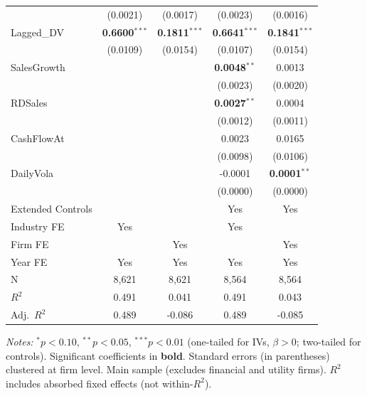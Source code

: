 \documentclass[11pt,a4paper]{article}
\begin{document}
\begin{table}[htbp]
\begin{tabular}{lcccc}
 & (0.0021) & (0.0017) & (0.0023) & (0.0016) \\
Lagged\_DV & \textbf{0.6600}$^{***}$ & \textbf{0.1811}$^{***}$ & \textbf{0.6641}$^{***}$ & \textbf{0.1841}$^{***}$ \\
 & (0.0109) & (0.0154) & (0.0107) & (0.0154) \\
SalesGrowth &  &  & \textbf{0.0048}$^{**}$ & 0.0013 \\
 &  &  & (0.0023) & (0.0020) \\
RDSales &  &  & \textbf{0.0027}$^{**}$ & 0.0004 \\
 &  &  & (0.0012) & (0.0011) \\
CashFlowAt &  &  & 0.0023 & 0.0165 \\
 &  &  & (0.0098) & (0.0106) \\
DailyVola &  &  & -0.0001 & \textbf{0.0001}$^{**}$ \\
 &  &  & (0.0000) & (0.0000) \\
\midrule
Extended Controls &  &  & Yes & Yes \\
Industry FE & Yes &  & Yes &  \\
Firm FE &  & Yes &  & Yes \\
Year FE & Yes & Yes & Yes & Yes \\
\midrule
N & 8,621 & 8,621 & 8,564 & 8,564 \\
$R^2$ & 0.491 & 0.041 & 0.491 & 0.043 \\
Adj.~$R^2$ & 0.489 & -0.086 & 0.489 & -0.085 \\
\bottomrule
\end{tabular}
\begin{minipage}{\linewidth}
\vspace{2pt}\scriptsize
\textit{Notes:} $^{*}p<0.10$, $^{**}p<0.05$, $^{***}p<0.01$ (one-tailed for IVs, $\beta > 0$; two-tailed for controls).
 Significant coefficients in \textbf{bold}.
 Standard errors (in parentheses) clustered at firm level.
 Main sample (excludes financial and utility firms).
 $R^2$ includes absorbed fixed effects (not within-$R^2$).
\end{minipage}
\end{table}
\clearpage
\end{document}
